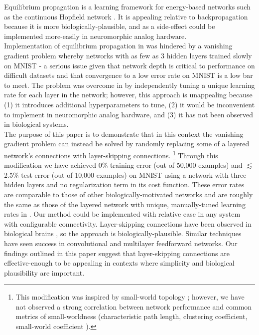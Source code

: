 \documentclass[utf8]{frontiersSCNS}
\newcommand{\npar}{\\\indent}
\begin{document}
Equilibrium propagation \cite{scellier17} is a learning framework for energy-based networks such as the continuous Hopfield network \cite{hopfield1984}. It is appealing relative to backpropagation because it is more biologically-plausible, and as a side-effect could be implemented more-easily in neuromorphic analog hardware.
\npar
Implementation of equilibrium propagation in \cite{scellier17} was hindered by a vanishing gradient problem whereby networks with as few as 3 hidden layers trained slowly on MNIST \cite{mnist1998} - a serious issue given that network depth is critical to performance on difficult datasets \cite{simonyan2014, srivastava2015tvdn} and that convergence to a low error rate on MNIST is a low bar to meet. The problem was overcome in \cite{scellier17} by independently tuning a unique learning rate for each layer in the network; however, this approach is unappealing because (1) it introduces additional hyperparameters to tune, (2) it would be inconvenient to implement in neuromorphic analog hardware, and (3) it has not been observed in biological systems.
\npar
The purpose of this paper is to demonstrate that in this context the vanishing gradient problem can instead be solved by randomly replacing some of a layered network's connections with layer-skipping connections.
\footnote{This modification was inspired by small-world topology \cite{watts98}; however, we have not observed a strong correlation between network performance and common metrics of small-worldness (characteristic path length, clustering coefficient, small-world coefficient ).}
Through this modification we have achieved 0\% training error (out of 50,000 examples) and $\lesssim$2.5\% test error (out of 10,000 examples) on MNIST using a network with three hidden layers and no regularization term in its cost function. These error rates are comparable to those of other biologically-motivated networks \cite{bartunov2018} and are roughly the same as those of the layered network with unique, manually-tuned learning rates in \cite{scellier17}. Our method could be implemented with relative ease in any system with configurable connectivity. Layer-skipping connections have been observed in biological brains \cite{bullmore2009}, so the approach is biologically-plausible. Similar techniques have seen success in convolutional \cite{he2015, srivastava2015} and multilayer feedforward \cite{xiaohu2011, krishnan2019} networks. Our findings outlined in this paper suggest that layer-skipping connections are effective-enough to be appealing in contexts where simplicity and biological plausibility are important.
\end{document}
